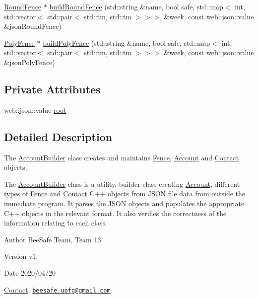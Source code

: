 \begin{DoxyCompactItemize}
\item 
\hyperlink{class_round_fence}{Round\+Fence} $\ast$ \hyperlink{class_account_builder_a0223a0830ba9a0e707c5a2bd5d74ee50}{build\+Round\+Fence} (std\+::string \&name, bool safe, std\+::map$<$ int, std\+::vector$<$ std\+::pair$<$ std\+::tm, std\+::tm $>$$>$$>$ \&week, const web\+::json\+::value \&json\+Round\+Fence)
\item 
\hyperlink{class_poly_fence}{Poly\+Fence} $\ast$ \hyperlink{class_account_builder_a9a93946d8ba8908f6bcfa6b793cc6277}{build\+Poly\+Fence} (std\+::string \&name, bool safe, std\+::map$<$ int, std\+::vector$<$ std\+::pair$<$ std\+::tm, std\+::tm $>$$>$$>$ \&week, const web\+::json\+::value \&json\+Poly\+Fence)
\end{DoxyCompactItemize}
\subsection*{Private Attributes}
\begin{DoxyCompactItemize}
\item 
web\+::json\+::value \hyperlink{class_account_builder_a7fcd16decc7765ef0a5fbea02fa56877}{root}
\end{DoxyCompactItemize}


\subsection{Detailed Description}
The \hyperlink{class_account_builder}{Account\+Builder} class creates and maintains \hyperlink{class_fence}{Fence}, \hyperlink{class_account}{Account} and \hyperlink{class_contact}{Contact} objects. 

The \hyperlink{class_account_builder}{Account\+Builder} class is a utility, builder class creating \hyperlink{class_account}{Account}, different types of \hyperlink{class_fence}{Fence} and \hyperlink{class_contact}{Contact} C++ objects from J\+S\+ON file data from outside the immediate program. It parses the J\+S\+ON objects and populates the appropriate C++ objects in the relevant format. It also verifies the correctness of the information relating to each class.

\begin{DoxyAuthor}{Author}
Bee\+Safe Team, Team 13
\end{DoxyAuthor}
\begin{DoxyVersion}{Version}
v1.
\end{DoxyVersion}
\begin{DoxyDate}{Date}
2020/04/20
\end{DoxyDate}
\hyperlink{class_contact}{Contact}\+: \href{mailto:beesafe.uofg@gmail.com}{\tt beesafe.\+uofg@gmail.\+com}

